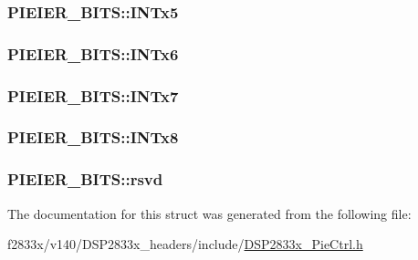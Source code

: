 \subsubsection[{I\+N\+Tx5}]{ P\+I\+E\+I\+E\+R\+\_\+\+B\+I\+T\+S\+::\+I\+N\+Tx5}\label{struct_p_i_e_i_e_r___b_i_t_s_abc058f3d4105da08f9cf8191e1eb7ef0}
\hypertarget{struct_p_i_e_i_e_r___b_i_t_s_a63b7b969b6a6090236d3731622aa351a}{}
\subsubsection[{I\+N\+Tx6}]{ P\+I\+E\+I\+E\+R\+\_\+\+B\+I\+T\+S\+::\+I\+N\+Tx6}\label{struct_p_i_e_i_e_r___b_i_t_s_a63b7b969b6a6090236d3731622aa351a}
\hypertarget{struct_p_i_e_i_e_r___b_i_t_s_a076f4a275ff475791b818ccf217652bf}{}
\subsubsection[{I\+N\+Tx7}]{ P\+I\+E\+I\+E\+R\+\_\+\+B\+I\+T\+S\+::\+I\+N\+Tx7}\label{struct_p_i_e_i_e_r___b_i_t_s_a076f4a275ff475791b818ccf217652bf}
\hypertarget{struct_p_i_e_i_e_r___b_i_t_s_a9baf02765efb7501fbdcbf192e2e70af}{}
\subsubsection[{I\+N\+Tx8}]{ P\+I\+E\+I\+E\+R\+\_\+\+B\+I\+T\+S\+::\+I\+N\+Tx8}\label{struct_p_i_e_i_e_r___b_i_t_s_a9baf02765efb7501fbdcbf192e2e70af}
\hypertarget{struct_p_i_e_i_e_r___b_i_t_s_a46e39a84bac6ce9b0cae10497c57bac0}{}
\subsubsection[{rsvd}]{ P\+I\+E\+I\+E\+R\+\_\+\+B\+I\+T\+S\+::rsvd}\label{struct_p_i_e_i_e_r___b_i_t_s_a46e39a84bac6ce9b0cae10497c57bac0}


The documentation for this struct was generated from the following file\+:\begin{DoxyCompactItemize}
\item 
f2833x/v140/\+D\+S\+P2833x\+\_\+headers/include/\hyperlink{_d_s_p2833x___pie_ctrl_8h}{D\+S\+P2833x\+\_\+\+Pie\+Ctrl.\+h}\end{DoxyCompactItemize}
